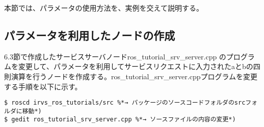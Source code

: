 本節では、パラメータの使用方法を、実例を交えて説明する。

\subsection{パラメータを利用したノードの作成}

6.3節で作成したサービスサーバノードros\_tutorial\_srv\_server.cpp  のプログラムを変更して、パラメータを利用してサービスリクエストに入力されたaとbの四則演算を行うノードを作成する。ros\_tutorial\_srv\_server.cppプログラムを変更する手順を以下に示す。

\begin{lstlisting}[language=ROS]
$ roscd irvs_ros_tutorials/src %*→ パッケージのソースコードフォルダのsrcフォルダに移動*)
$ gedit ros_tutorial_srv_server.cpp %*→ ソースファイルの内容の変更*)
\end{lstlisting}

